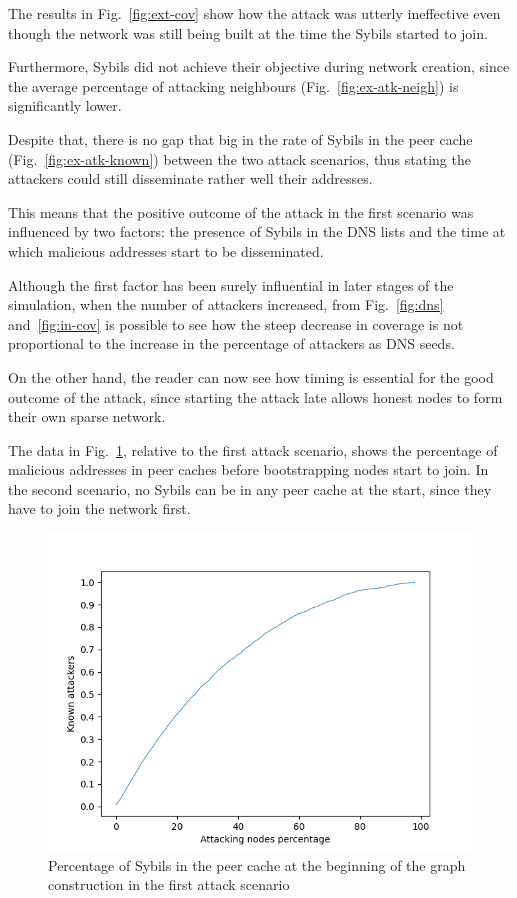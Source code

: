 The results in Fig.~\ref{fig:ext-cov} show how the attack was utterly ineffective even though the network was still being built at the time the Sybils started to join.
 
Furthermore, Sybils did not achieve their objective during network creation, since the average percentage of attacking neighbours (Fig.~\ref{fig:ex-atk-neigh}) is significantly lower.

Despite that, there is no gap that big in the rate of Sybils in the peer cache (Fig.~\ref{fig:ex-atk-known}) between the two attack scenarios, thus stating the attackers could still disseminate rather well their addresses.

This means that the positive outcome of the attack in the first scenario was influenced by two factors: the presence of Sybils in the DNS lists and the time at which malicious addresses start to be disseminated.

Although the first factor has been surely influential in later stages of the simulation, when the number of attackers increased, from Fig.~\ref{fig:dns} and~\ref{fig:in-cov} is possible to see how the steep decrease in coverage is not proportional to the increase in the percentage of attackers as DNS seeds.

On the other hand, the reader can now see how timing is essential for the good outcome of the attack, since starting the attack late allows honest nodes to form their own sparse network.

The data in Fig.~\ref{fig:beginning}, relative to the first attack scenario, shows the percentage of malicious addresses in peer caches before bootstrapping nodes start to join. In the second scenario, no Sybils can be in any peer cache at the start, since they have to join the network first.\par

\begin{figure}[h!]
	\includegraphics[width=.7\textwidth]{pict/results/in-atkknown-beginning.png}
	\centering
	\caption{Percentage of Sybils in the peer cache at the beginning of the graph construction in the first attack scenario}
	\label{fig:beginning}
\end{figure}


